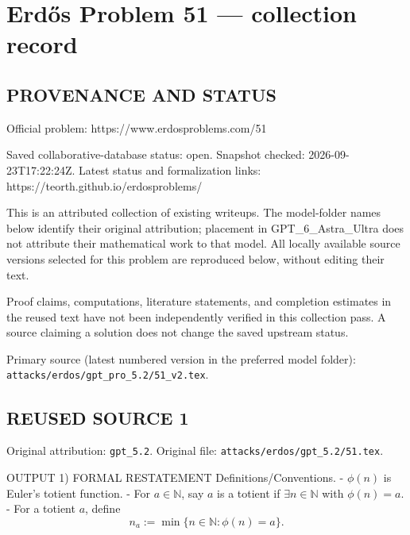 \section*{Erd\H{o}s Problem 51 --- collection record}

\subsection*{PROVENANCE AND STATUS}
Official problem: https://www.erdosproblems.com/51

Saved collaborative-database status: open.
Snapshot checked: 2026-09-23T17:22:24Z.
Latest status and formalization links: https://teorth.github.io/erdosproblems/

This is an attributed collection of existing writeups. The model-folder names below identify their original attribution; placement in GPT\_6\_Astra\_Ultra does not attribute their mathematical work to that model. All locally available source versions selected for this problem are reproduced below, without editing their text.

Proof claims, computations, literature statements, and completion estimates in the reused text have not been independently verified in this collection pass. A source claiming a solution does not change the saved upstream status.

Primary source (latest numbered version in the preferred model folder): \texttt{attacks/erdos/gpt\_pro\_5.2/51\_v2.tex}.

\subsection*{REUSED SOURCE 1}
Original attribution: \texttt{gpt\_5.2}.
Original file: \texttt{attacks/erdos/gpt\_5.2/51.tex}.


OUTPUT
1) FORMAL RESTATEMENT
Definitions/Conventions.
- $\phi(n)$ is Euler's totient function.
- For $a\in\mathbb N$, say $a$ is a totient if $\exists n\in\mathbb N$ with $\phi(n)=a$.
- For a totient $a$, define
\[n_a:=\min\{n\in\mathbb N:\phi(n)=a\}.\]

